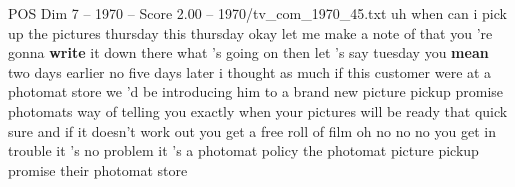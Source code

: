 \begin{textsample}{POS Dim 7 – 1970 – Score 2.00 – 1970/tv\_com\_1970\_45.txt}  \label{ex:f7_pos_033}
uh when can i pick up the pictures thursday this thursday okay let me make a note of that you 're gonna \textbf{write} it down there what 's going on then let 's say tuesday you \textbf{mean} two days earlier no five days later i thought as much if this customer were at a photomat store we 'd be introducing him to a brand new picture pickup promise photomats way of telling you exactly when your pictures will be ready that quick sure and if it doesn't work out you get a free roll of film oh no no no you get in trouble it 's no problem it 's a photomat policy the photomat picture pickup promise their photomat store

\end{textsample}
